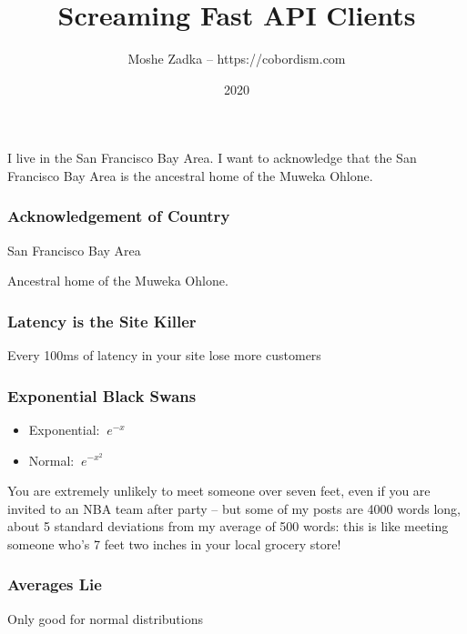 \usepackage{hyperref}
\usepackage{graphicx}
\usepackage{listings}
\usepackage{textcomp}
\usepackage{fancyvrb}

\title{Screaming Fast API Clients}
\author{Moshe Zadka -- https://cobordism.com}
\date{2020}


\begin{titlepage}
\maketitle
\end{titlepage}

\frame{\titlepage}

I live in the San Francisco Bay Area.
I want to acknowledge that the San Francisco Bay Area
is the ancestral home of the Muweka Ohlone.

\begin{frame}
\frametitle{Acknowledgement of Country}

San Francisco Bay Area

Ancestral home of the Muweka Ohlone.

\end{frame}

\begin{frame}
\frametitle{Latency is the Site Killer}

Every 100ms of latency in your site lose more customers

\end{frame}

\begin{frame}
\frametitle{Exponential Black Swans}

\begin{itemize}
\item Exponential: $~e^{-x}$
\item Normal: $~e^{-x^2}$
\end{itemize}

\end{frame}

You are extremely unlikely to meet someone over seven feet,
even if you are invited to an NBA team after party --
but some of my posts are 4000 words long,
about 5 standard deviations from my average of 500 words:
this is like meeting someone who's 7 feet two inches
in your local grocery store!

\begin{frame}
\frametitle{Averages Lie}

Only good for normal distributions

\end{frame}

